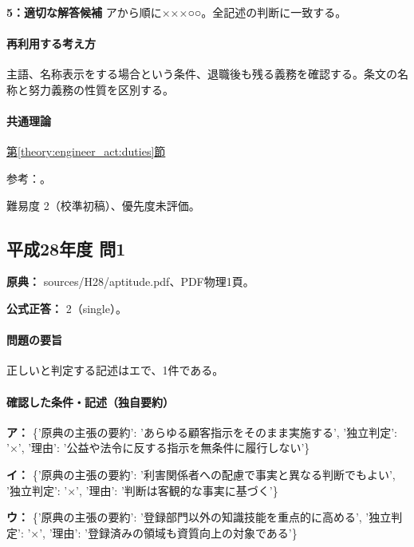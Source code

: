 \noindent\textbf{5：適切な解答候補} アから順に×××○○。全記述の判断に一致する。\par

\paragraph{再利用する考え方} 主語、名称表示をする場合という条件、退職後も残る義務を確認する。条文の名称と努力義務の性質を区別する。

\paragraph{共通理論} \hyperref[theory:engineer_act:duties]{第\ref*{theory:engineer_act:duties}節}

\par 参考：\cite{engineer_act_current}。

\par 難易度 2（校準初稿）、優先度未評価。

\subsection{平成28年度 問1}
\label{q:h28-reg-apt-01}

\noindent\textbf{原典：} sources/H28/aptitude.pdf、PDF物理1頁。

\textbf{公式正答：} 2（single）。

\paragraph{問題の要旨} 正しいと判定する記述はエで、1件である。

\paragraph{確認した条件・記述（独自要約）}\mbox{}\par

\noindent\textbf{ア：} \{'原典の主張の要約': 'あらゆる顧客指示をそのまま実施する', '独立判定': '×', '理由': '公益や法令に反する指示を無条件に履行しない'\}\par

\noindent\textbf{イ：} \{'原典の主張の要約': '利害関係者への配慮で事実と異なる判断でもよい', '独立判定': '×', '理由': '判断は客観的な事実に基づく'\}\par

\noindent\textbf{ウ：} \{'原典の主張の要約': '登録部門以外の知識技能を重点的に高める', '独立判定': '×', '理由': '登録済みの領域も資質向上の対象である'\}\par

